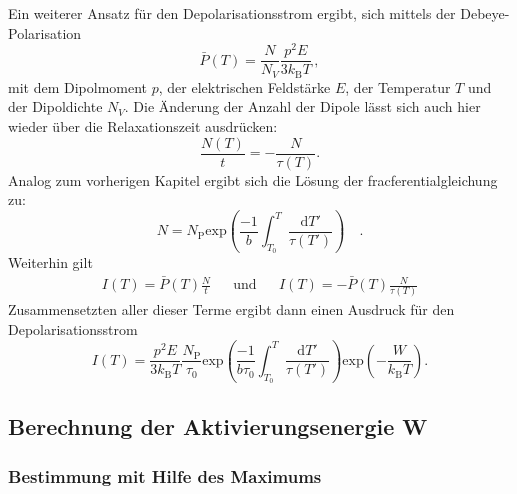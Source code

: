 Ein weiterer Ansatz für den Depolarisationsstrom ergibt, sich mittels der Debeye-Polarisation
\begin{equation}
    \bar{P}(T) = \frac{N}{N_V}\frac{p^2E}{3k_\text{B}T} \, ,
\end{equation}	
mit dem Dipolmoment $p$, der elektrischen Feldstärke $E$, der Temperatur $T$ und der Dipoldichte $N_V$.
Die Änderung der Anzahl der Dipole lässt sich auch hier wieder über die Relaxationszeit ausdrücken:
\begin{equation}
    \frac{N(T)}{t} =- \frac{N}{\tau(T)}.
\end{equation}
Analog zum vorherigen Kapitel ergibt sich die Lösung der fracferentialgleichung zu:
\begin{equation}
    N = N_\text{P} \text{exp}\left( \frac{-1}{b}\int_{T_0}^T \frac{\text{d}T'}{\tau(T')}\right) \quad .
\end{equation}
Weiterhin gilt
\begin{align}
    I(T) = \bar{P}(T)\frac{N}{t}& &\text{und} & & I(T) = -\bar{P}(T) \frac{N}{\tau(T)}
\end{align}
Zusammensetzten aller dieser Terme ergibt dann einen Ausdruck für den Depolarisationsstrom
\begin{equation}
    I(T) =\frac{p^2E}{3k_\text{B}T}\frac{N_\text{P}}{\tau_0}\text{exp}\left(\frac{-1}{b\tau_0}\int_{T_0}^T\frac{\text{d}T'}{\tau(T')}\right)\text{exp}\left(-\frac{W}{k_\text{B}T}\right).
    \label{eqn:long}
\end{equation}		

\subsection{Berechnung der Aktivierungsenergie W}

\subsubsection{Bestimmung mit Hilfe des Maximums}

